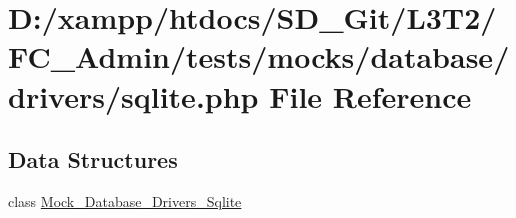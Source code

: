 \hypertarget{drivers_2sqlite_8php}{}\section{D\+:/xampp/htdocs/\+S\+D\+\_\+\+Git/\+L3\+T2/\+F\+C\+\_\+\+Admin/tests/mocks/database/drivers/sqlite.php File Reference}
\label{drivers_2sqlite_8php}
\subsection*{Data Structures}
\begin{DoxyCompactItemize}
\item 
class \hyperlink{class_mock___database___drivers___sqlite}{Mock\+\_\+\+Database\+\_\+\+Drivers\+\_\+\+Sqlite}
\end{DoxyCompactItemize}
